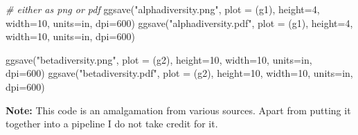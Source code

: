 \documentclass[
]{book}
\newenvironment{Shaded}{\begin{snugshade}}{\end{snugshade}}
\newcommand{\AttributeTok}[1]{\textcolor[rgb]{0.77,0.63,0.00}{#1}}
\newcommand{\CommentTok}[1]{\textcolor[rgb]{0.56,0.35,0.01}{\textit{#1}}}
\newcommand{\DecValTok}[1]{\textcolor[rgb]{0.00,0.00,0.81}{#1}}
\newcommand{\FunctionTok}[1]{\textcolor[rgb]{0.00,0.00,0.00}{#1}}
\newcommand{\NormalTok}[1]{#1}
\newcommand{\StringTok}[1]{\textcolor[rgb]{0.31,0.60,0.02}{#1}}
\begin{document}
\begin{Shaded}
\begin{Highlighting}[]
\CommentTok{\# either as png or pdf}
\FunctionTok{ggsave}\NormalTok{(}\StringTok{"alphadiversity.png"}\NormalTok{, }\AttributeTok{plot =}\NormalTok{ (g1), }\AttributeTok{height=}\DecValTok{4}\NormalTok{, }\AttributeTok{width=}\DecValTok{10}\NormalTok{, }\AttributeTok{units=}\StringTok{\textquotesingle{}in\textquotesingle{}}\NormalTok{, }\AttributeTok{dpi=}\DecValTok{600}\NormalTok{)}
\FunctionTok{ggsave}\NormalTok{(}\StringTok{"alphadiversity.pdf"}\NormalTok{, }\AttributeTok{plot =}\NormalTok{ (g1), }\AttributeTok{height=}\DecValTok{4}\NormalTok{, }\AttributeTok{width=}\DecValTok{10}\NormalTok{, }\AttributeTok{units=}\StringTok{\textquotesingle{}in\textquotesingle{}}\NormalTok{, }\AttributeTok{dpi=}\DecValTok{600}\NormalTok{)}

\FunctionTok{ggsave}\NormalTok{(}\StringTok{"betadiversity.png"}\NormalTok{, }\AttributeTok{plot =}\NormalTok{ (g2), }\AttributeTok{height=}\DecValTok{10}\NormalTok{, }\AttributeTok{width=}\DecValTok{10}\NormalTok{, }\AttributeTok{units=}\StringTok{\textquotesingle{}in\textquotesingle{}}\NormalTok{, }\AttributeTok{dpi=}\DecValTok{600}\NormalTok{)}
\FunctionTok{ggsave}\NormalTok{(}\StringTok{"betadiversity.pdf"}\NormalTok{, }\AttributeTok{plot =}\NormalTok{ (g2), }\AttributeTok{height=}\DecValTok{10}\NormalTok{, }\AttributeTok{width=}\DecValTok{10}\NormalTok{, }\AttributeTok{units=}\StringTok{\textquotesingle{}in\textquotesingle{}}\NormalTok{, }\AttributeTok{dpi=}\DecValTok{600}\NormalTok{)}
\end{Highlighting}
\end{Shaded}

\textbf{Note:}
This code is an amalgamation from various sources. Apart from putting it together into a pipeline I do not take credit for it.

  
\end{document}
